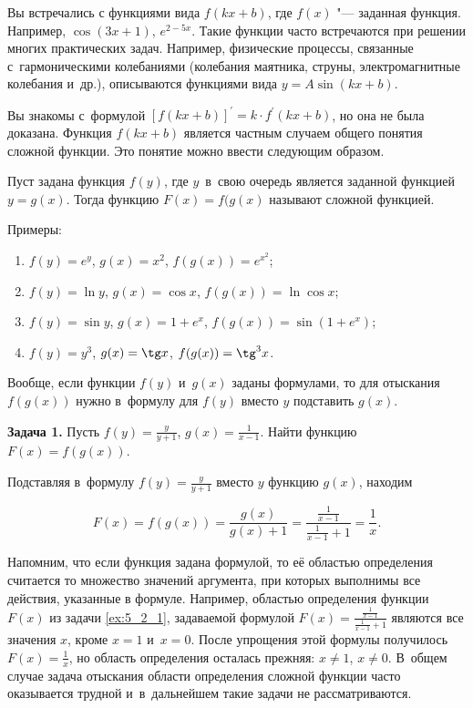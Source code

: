 
Вы встречались с функциями вида $f(kx + b)$, где $f(x)$ "--- заданная функция.
Например, $\cos (3x + 1)$, $e^{2 - 5x}$. Такие функции часто встречаются
при решении многих практических задач. Например, физические процессы, связанные
с~гармоническими колебаниями (колебания маятника, струны, электромагнитные колебания
и~др.), описываются функциями вида $y = A \sin (kx + b)$.

Вы знакомы с~формулой $\left[ f(kx + b) \right]^\prime = k \cdot f^\prime (kx + b)$,
но она не была доказана. Функция $f(kx + b)$ является частным случаем общего понятия
сложной функции. Это понятие можно ввести следующим образом.

Пуст задана функция $f(y)$, где $y$~в~свою очередь является
заданной функцией $y = g(x)$. Тогда функцию $F(x) = f(g(x)$ называют сложной функцией.

Примеры:

\begin{enumerate}
\item $f(y) = e^{y}$, \;  $g(x) = x^{2}$, \; $f(g(x)) = e^{x^{2}}$;
\item $f(y) = \ln y$, \; $g(x) = \cos x$, \; $f(g(x)) = \ln \cos x$;
\item $f(y) = \sin y$, \; $g(x) = 1 + e^{x}$, \; $f(g(x)) = \sin (1 + e^{x})$;
\item $f(y) = y^{3}$, \; $g(x) = \tg x$, \; $f(g(x)) = \tg^{3} x$.
\end{enumerate}

Вообще, если функции $f(y)$ и~$g(x)$ заданы формулами, то для отыскания $f(g(x))$
нужно в~формулу для $f(y)$ вместо $y$ подставить $g(x)$.

\textbf{Задача 1.}\label{ex:5_2_1} Пусть $\displaystyle f(y) = \frac{y}{y + 1}$,
$\displaystyle g(x) = \frac{1}{x - 1}$. Найти функцию $F(x) = f(g(x))$.

Подставляя в~формулу $\displaystyle f(y) = \frac{y}{y + 1}$ вместо $y$ функцию
$g(x)$, находим

\begin{equation*}
\displaystyle F(x) = f(g(x)) =
\frac{g(x)}{g(x) + 1} =
\frac{\frac{1}{x - 1}}{\frac{1}{x - 1} + 1} = \frac{1}{x}.
\end{equation*}

Напомним, что если функция задана формулой, то её областью определения считается
то множество значений аргумента, при которых выполнимы все действия,
указанные в формуле.
Например, областью определения функции $F(x)$ из задачи \ref{ex:5_2_1},
задаваемой формулой 
$\displaystyle F(x) = \frac{\frac{1}{x-1}}{\frac{1}{x-1}+1}$
являются все значения $x$, кроме $x=1$ и~$x=0$.
После упрощения этой формулы получилось $\displaystyle F(x) = \frac{1}{x}$,
но область определения осталась прежняя: $x \ne 1$, $x \ne 0$.
В~общем случае задача отыскания области определения сложной функции часто оказывается
трудной и~в~дальнейшем такие задачи не рассматриваются.

